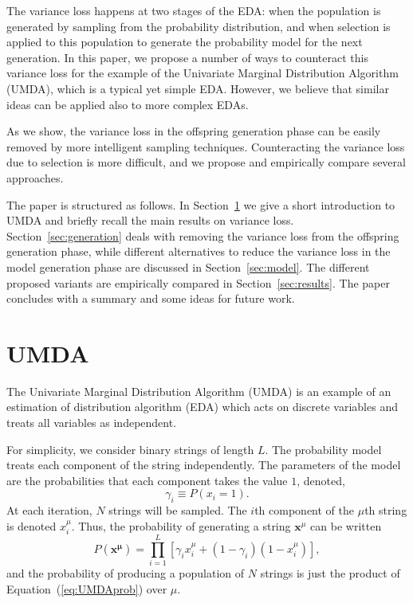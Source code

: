 \documentclass{acm_proc_article-sp}
\newcommand{\Ls}{L}
\newcommand{\Np}{N}
\newcommand{\p}{\gamma}
\newcommand{\groupr}[1]{\ensuremath{\left( #1 \right)}}
\newcommand{\groups}[1]{\ensuremath{\left[ #1 \right]}}
\begin{document}
The variance loss happens at two stages of the EDA: when the
population is generated by sampling from the probability
distribution, and when selection is applied to this population to generate the
probability model for the next generation.  In this paper,
we propose a number of ways to counteract this variance loss for the
example of the Univariate Marginal Distribution Algorithm (UMDA),
which is a typical yet simple EDA. However, we believe that similar
ideas can be applied also to more complex EDAs.

As we show, the variance loss in the offspring generation phase can be
easily removed by more intelligent sampling techniques. Counteracting
the variance loss due to selection is more difficult, and we propose
and empirically compare several approaches.

The paper is structured as follows. In Section~\ref{sec:umda} we give
a short introduction to UMDA and briefly recall the main results on
variance loss. Section~\ref{sec:generation} deals with removing
the variance loss from the offspring generation phase, while different
alternatives to reduce the variance loss in the model generation phase
are discussed in Section~\ref{sec:model}. The different proposed variants
are empirically compared in Section~\ref{sec:results}. The paper concludes
with a summary and some ideas for future work.

\section{UMDA}
\label{sec:umda}

The Univariate Marginal Distribution Algorithm (UMDA)
\cite{Muhlenbein1999} is an example of an estimation of distribution
algorithm (EDA) which acts on discrete variables and treats all
variables as independent. 

For simplicity, we consider binary strings of length $\Ls$. The
probability model treats each component of the string independently.
The parameters of the model are the probabilities that each component
takes the value $1$, denoted,
\begin{equation}
  \label{eq:UMDA_parameters}
  \p_i \equiv P(x_i = 1).
\end{equation}
At each iteration, $\Np$ strings will be sampled. The $i$th component of
the $\mu$th string is denoted $x_i^\mu$. Thus, the probability of
generating a string $\mathbf{x}^\mu$ can be written
\begin{equation}
  \label{eq:UMDAprob}
  P(\mathbf{x^\mu}) = \prod_{i=1}^{\Ls} \groups{\p_i {x_i^\mu}+
   \groupr{1-\p_i} {\groupr{1-x_i^\mu}}},
\end{equation}
and the probability of producing a population of $\Np$ strings is just
the product of Equation~(\ref{eq:UMDAprob}) over $\mu$.
                                                                                
\end{document}
